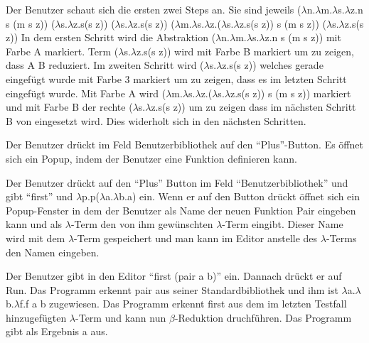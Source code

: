 \documentclass[parskip=full,11pt,twoside]{scrartcl}
\begin{document}
{Der Benutzer schaut sich die ersten zwei Steps an. Sie sind jeweils
 \newline ($\lambda$n.$\lambda$m.$\lambda$s.$\lambda$z.n s (m s z)) ($\lambda$s.$\lambda$z.s(s z)) ($\lambda$s.$\lambda$z.s(s z))
 \newline ($\lambda$m.$\lambda$s.$\lambda$z.($\lambda$s.$\lambda$z.s(s z)) s (m s z)) ($\lambda$s.$\lambda$z.s(s z))
}
{In dem ersten Schritt wird die Abstraktion ($\lambda$n.$\lambda$m.$\lambda$s.$\lambda$z.n s (m s z)) mit Farbe A markiert. Term  ($\lambda$s.$\lambda$z.s(s z)) wird mit Farbe B markiert um zu zeigen, dass A B reduziert. Im zweiten Schritt wird  ($\lambda$s.$\lambda$z.s(s z)) welches gerade eingefügt wurde mit Farbe 3 markiert um zu zeigen, dass es im letzten Schritt eingefügt wurde. Mit Farbe A wird ($\lambda$m.$\lambda$s.$\lambda$z.($\lambda$s.$\lambda$z.s(s z)) s (m s z)) markiert und mit Farbe B der rechte ($\lambda$s.$\lambda$z.s(s z)) um zu zeigen dass im nächsten Schritt B von eingesetzt wird. Dies widerholt sich in den nächsten Schritten. }



{Der Benutzer drückt im Feld Benutzerbibliothek auf den \enquote{Plus}-Button.}
{Es öffnet sich ein Popup, indem der Benutzer eine Funktion definieren kann.}

{Der Benutzer drückt auf den \enquote{Plus} Button im Feld \enquote{Benutzerbibliothek} und gibt \enquote {first} und $\lambda$p.p($\lambda$a.$\lambda$b.a) ein.}
{Wenn er auf den Button drückt öffnet sich ein Popup-Fenster in dem der Benutzer als Name der neuen Funktion Pair eingeben kann und als $\lambda$-Term den von ihm gewünschten $\lambda$-Term eingibt. Dieser Name wird mit dem $\lambda$-Term gespeichert und man kann im Editor anstelle des $\lambda$-Terms den Namen eingeben.}

{ Der Benutzer gibt in den Editor \enquote {first (pair a b)} ein. Dannach drückt er auf Run.}
{ Das Programm erkennt pair aus seiner Standardbibliothek und ihm ist $\lambda$a.$\lambda$b.$\lambda$f.f a b  zugewiesen. Das Programm erkennt first aus dem im letzten Testfall hinzugefügten $\lambda$-Term und kann nun $\beta$-Reduktion druchführen. Das Programm gibt als Ergebnis a aus.}
\end{document}
